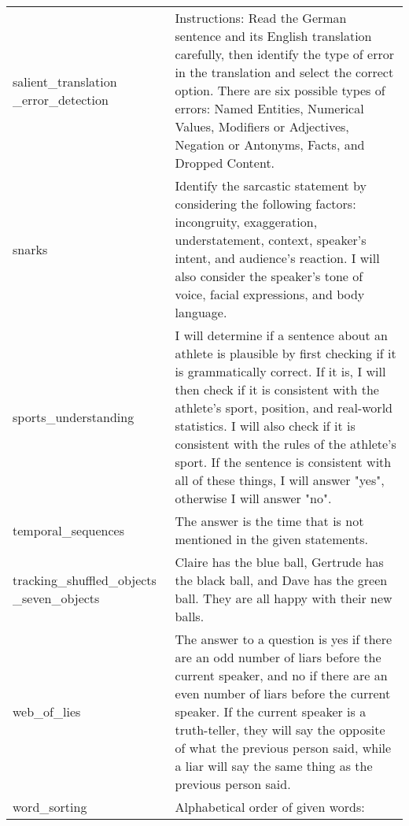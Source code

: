 \begin{table}[H]
{\begin{tabular}{P{2.3cm}P{11.6cm}}
salient\_translation \_error\_detection & Instructions: Read the German sentence and its English translation carefully, then identify the type of error in the translation and select the correct option. There are six possible types of errors: Named Entities, Numerical Values, Modifiers or Adjectives, Negation or Antonyms, Facts, and Dropped Content.\\ [2ex]
snarks & Identify the sarcastic statement by considering the following factors: incongruity, exaggeration, understatement, context, speaker's intent, and audience's reaction. I will also consider the speaker's tone of voice, facial expressions, and body language.\\ [2ex]
sports\_understanding & I will determine if a sentence about an athlete is plausible by first checking if it is grammatically correct. If it is, I will then check if it is consistent with the athlete's sport, position, and real-world statistics. I will also check if it is consistent with the rules of the athlete's sport. If the sentence is consistent with all of these things, I will answer "yes", otherwise I will answer "no".\\ [2ex]
temporal\_sequences & The answer is the time that is not mentioned in the given statements. \\ [2ex]
tracking\_shuffled\_objects \_seven\_objects & Claire has the blue ball, Gertrude has the black ball, and Dave has the green ball. They are all happy with their new balls. \\ [2ex]
web\_of\_lies & The answer to a question is yes if there are an odd number of liars before the current speaker, and no if there are an even number of liars before the current speaker. If the current speaker is a truth-teller, they will say the opposite of what the previous person said, while a liar will say the same thing as the previous person said. \\ [2ex]
word\_sorting & Alphabetical order of given words: \\
\bottomrule
\end{tabular}
}
\label{table:found_instructions_on_bbh_tasks_palm_2_l}
\end{table}

